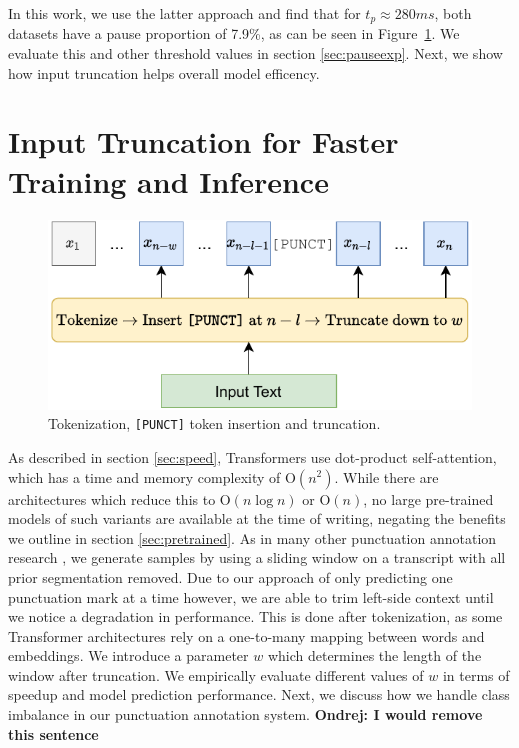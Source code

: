 \documentclass[bsc,deptreport,ai]{infthesis} %
\newcommand{\Ondrej}[1]{{\color{red} \textbf{Ondrej: #1}}}
\begin{document}
In this work, we use the latter approach and find that for $t_p\approx 280ms$, both datasets have a pause proportion of 7.9\%, as can be seen in Figure~\ref{fig:idealthreshold}. We evaluate this and other threshold values in section \ref{sec:pauseexp}. Next, we show how input truncation helps overall model efficency.

\section{Input Truncation for Faster Training and Inference}
\label{sec:window}
\begin{figure}[!htb]
\centering
\includegraphics[width=.6\textwidth]{truncate.pdf}
\caption{Tokenization, \texttt{[PUNCT]} token insertion and truncation.}
\label{fig:idealthreshold}
\end{figure}
As described in section \ref{sec:speed}, Transformers use dot-product self-attention, which has a time and memory complexity of $\mathrm{O}(n^2)$. While there are architectures which reduce this to $\mathrm{O}(n\log n)$ or $\mathrm{O}(n)$, no large pre-trained models of such variants are available at the time of writing, negating the benefits we outline in section \ref{sec:pretrained}. As in many other punctuation annotation research \citep{Tilk2015,yi2019speech2vec,sotapunctuation}, we generate samples by using a sliding window on a transcript with all prior segmentation removed. Due to our approach of only predicting one punctuation mark at a time however, we are able to trim left-side context until we notice a degradation in performance. This is done after tokenization, as some Transformer architectures rely on a one-to-many mapping between words and embeddings. We introduce a parameter $w$ which determines the length of the window after truncation. We empirically evaluate different values of $w$ in terms of speedup and model prediction performance. Next, we discuss how we handle class imbalance in our punctuation annotation system.\Ondrej{I would remove this sentence}
\end{document}
